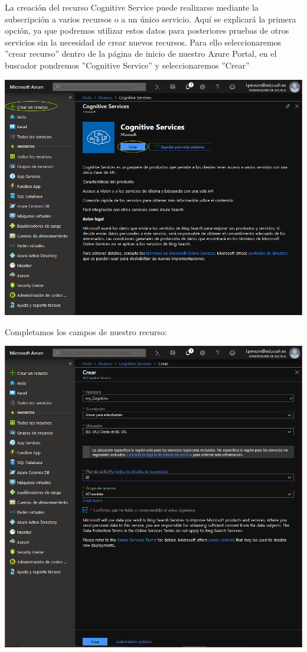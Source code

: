 \documentclass[english,runningheads,a4paper]{llncs}[2018/03/10]
\newenvironment{nscenter}
 {\parskip=0pt\par\nopagebreak\centering}
 {\par\noindent\ignorespacesafterend}
\begin{document}
    La creación del recurso Cognitive Service puede realizarse mediante la 
    subscripción a varios recursos o a un único servicio. Aquí se explicará la 
    primera opción, ya que podremos utilizar estos datos para posteriores 
    pruebas de otros servicios sin la necesidad de crear nuevos recursos. 
    Para ello seleccionaremos ''crear recurso'' dentro de la página de inicio 
    de nuestro Azure Portal, en el buscador pondremos ''Cognitive Service'' y 
    seleccionaremos ''Crear''
    
    \begin{nscenter}
        \includegraphics[scale = 0.25]{./IA/AZURE/crearRecursoCS.png}
    \end{nscenter}
    \newpage Completamos los campos de nuestro recurso:
    
    \begin{nscenter}
        \centering
        \includegraphics[scale = 0.25]{./IA/AZURE/confCognitive.PNG}
    \end{nscenter}
    
\end{document}
